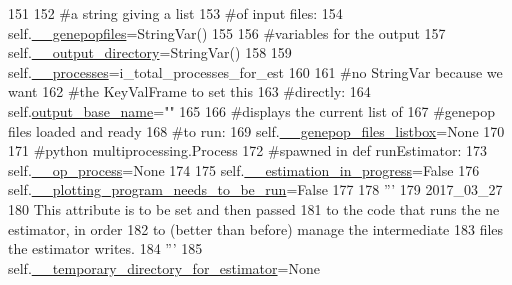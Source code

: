 \begin{DoxyCode}
151         
152         \textcolor{comment}{#a string giving a list }
153         \textcolor{comment}{#of input files:}
154         self.\hyperlink{classnegui_1_1pgguineestimator__experimental_1_1PGGuiNeEstimator_a6693f13d1e39d94e4eb9db3ec883ef0d}{\_\_genepopfiles}=StringVar()
155 
156         \textcolor{comment}{#variables for the output}
157         self.\hyperlink{classnegui_1_1pgguineestimator__experimental_1_1PGGuiNeEstimator_a2f6aee9051e4fa930c78240bd45560c8}{\_\_output\_directory}=StringVar()
158 
159         self.\hyperlink{classnegui_1_1pgguineestimator__experimental_1_1PGGuiNeEstimator_aaf5cdaff0dd43af6e81c805611680fa6}{\_\_processes}=i\_total\_processes\_for\_est
160 
161         \textcolor{comment}{#no StringVar because we want}
162         \textcolor{comment}{#the KeyValFrame to set this}
163         \textcolor{comment}{#directly:}
164         self.\hyperlink{classnegui_1_1pgguineestimator__experimental_1_1PGGuiNeEstimator_aa99bb40c806d746401e2b59bbdc7d0a8}{output\_base\_name}=\textcolor{stringliteral}{""}
165 
166         \textcolor{comment}{#displays the current list of}
167         \textcolor{comment}{#genepop files loaded and ready}
168         \textcolor{comment}{#to run:}
169         self.\hyperlink{classnegui_1_1pgguineestimator__experimental_1_1PGGuiNeEstimator_a64dd0ed27ae7141a500bea7103d5899d}{\_\_genepop\_files\_listbox}=\textcolor{keywordtype}{None}
170 
171         \textcolor{comment}{#python multiprocessing.Process}
172         \textcolor{comment}{#spawned in def runEstimator:}
173         self.\hyperlink{classnegui_1_1pgguineestimator__experimental_1_1PGGuiNeEstimator_aaa2c18e3d44dde92b66cb9ebe54463b6}{\_\_op\_process}=\textcolor{keywordtype}{None}
174 
175         self.\hyperlink{classnegui_1_1pgguineestimator__experimental_1_1PGGuiNeEstimator_ac131c55f1049b06db3754e60657cf621}{\_\_estimation\_in\_progress}=\textcolor{keyword}{False}
176         self.\hyperlink{classnegui_1_1pgguineestimator__experimental_1_1PGGuiNeEstimator_ab9782b5b4071976681cfbd22a8504f87}{\_\_plotting\_program\_needs\_to\_be\_run}=\textcolor{keyword}{False}
177 
178         \textcolor{stringliteral}{'''}
179 \textcolor{stringliteral}{        2017\_03\_27}
180 \textcolor{stringliteral}{        This attribute is to be set and then passed }
181 \textcolor{stringliteral}{        to the code that runs the ne estimator, in order}
182 \textcolor{stringliteral}{        to (better than before) manage the intermediate}
183 \textcolor{stringliteral}{        files the estimator writes.}
184 \textcolor{stringliteral}{        '''}
185         self.\hyperlink{classnegui_1_1pgguineestimator__experimental_1_1PGGuiNeEstimator_a3a28a6a754afc8069d729f0d48e044bf}{\_\_temporary\_directory\_for\_estimator}=\textcolor{keywordtype}{None}

\end{DoxyCode}
